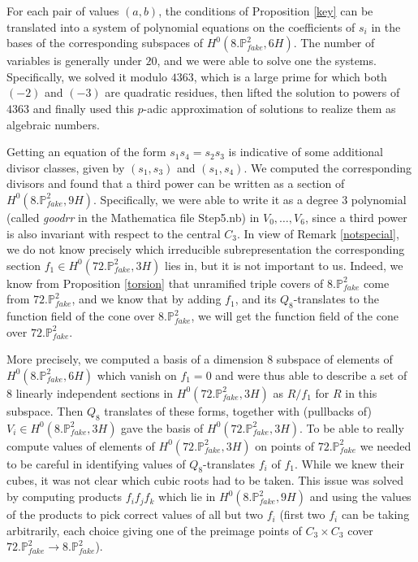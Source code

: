 \documentclass[11pt,reqno]{amsart}
\def\P {{\mathbb P}}
\def\FPP {{\P^2_{fake}}}
\theoremstyle{definition}
\numberwithin{equation}{section}
\begin{document}
For each pair of values $(a,b)$, the conditions of Proposition \ref{key} can be translated into a system of polynomial equations on the coefficients of $s_i$ in the bases of the corresponding subspaces of $H^0(8.\FPP,6H)$. The number of variables is generally under $20$, and we were able to solve one the systems. Specifically, we solved it modulo $4363$, which is a large prime for which both $(-2)$ and $(-3)$ are quadratic residues, then lifted the solution to powers of $4363$ and finally used this $p$-adic approximation of solutions to realize them as algebraic numbers.

\medskip
Getting an equation of the form $s_1 s_4 = s_2 s_3$ is indicative of some additional divisor classes, given by $(s_1,s_3)$ and $(s_1,s_4)$. We computed the corresponding divisors 
and found that a third power can be written as a section of $H^0(8.\FPP,9H)$. Specifically, we were able to write it as a degree $3$ polynomial (called \emph{goodrr} in the Mathematica file Step5.nb) in $V_0,\ldots, V_6$, since a third power is also invariant with respect to the central $C_3$. In view of Remark \ref{notspecial}, we do not know precisely which irreducible subrepresentation the corresponding section $f_1\in H^0(72.\FPP,3H)$ lies in, but it is not important to us. Indeed, we know from Proposition \ref{torsion} that unramified triple covers of $8.\FPP$ come from $72.\FPP$, and we know that by adding $f_1$, and its $Q_8$-translates to the function field of the cone over $8.\FPP$, we will get the function field of the cone over  $72.\FPP$.

\medskip
More precisely, we computed a basis of a dimension $8$ subspace of elements of $H^0(8.\FPP,6H)$ which vanish on $f_1=0$ and were thus able to describe a set of $8$ linearly independent sections in $H^0(72.\FPP,3H)$ as $R/f_1$ for $R$ in this subspace. Then $Q_8$ translates of these forms, together with (pullbacks of) $V_i\in H^0(8.\FPP,3H)$ gave the basis of  $H^0(72.\FPP,3H)$. To be able to really compute values of 
elements of $H^0(72.\FPP,3H)$ on points of $72.\FPP$ we needed to be careful in identifying values of $Q_8$-translates  $f_i$ of $f_1$. While we knew their cubes, it was not clear which cubic roots had to be taken. This issue was solved by computing products $f_i f_j f_k$ which lie in $H^0(8.\FPP,9H)$ and using the values of the products to pick correct values of all but two $f_i$ (first two $f_i$ can be taking arbitrarily, each choice giving one of the preimage points of $C_3\times C_3$ cover $72.\FPP\to 8.\FPP$).
\end{document}
